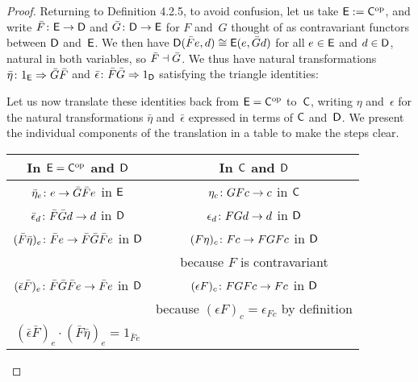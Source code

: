 \documentclass[../../solutions]{subfiles}
\begin{document}
\begin{proof}
  Returning to Definition 4.2.5, to avoid confusion, let us take
  ${\mathsf{E}}:={\mathsf{C}}^{\mathrm{op}}$, and write ${\bar F}\colon{{\mathsf{E}}}\to{{\mathsf{D}}}$ and
  ${\bar G}\colon{{\mathsf{D}}}\to{{\mathsf{E}}}$ for $F$ and~$G$ thought of as
  contravariant functors between ${\mathsf{D}}$ and~${\mathsf{E}}$.  We then have
  ${\mathsf{D}}(\bar Fe,d)\cong {\mathsf{E}}(e,\bar Gd)$ for all $e\in{\mathsf{E}}$ and
  $d\in{\mathsf{D}}$, natural in both variables, so $\bar F\dashv \bar G$.  We
  thus have natural transformations
  ${\bar\eta}\colon{1_{\mathsf{E}}}\Rightarrow{\bar G \bar F}$ and
  ${\bar\epsilon}\colon{\bar F \bar G}\Rightarrow{1_{\mathsf{D}}}$ satisfying the triangle
  identities:
  \begin{center}
  \end{center}
  Let us now translate these identities back from ${\mathsf{E}}={\mathsf{C}}^{\mathrm{op}}$
  to~${\mathsf{C}}$, writing $\eta$ and~$\epsilon$ for the natural
  transformations $\bar\eta$ and~$\bar\epsilon$ expressed in terms of
  ${\mathsf{C}}$ and~${\mathsf{D}}$.  We present the individual components of the
  translation in a table to make the steps clear.
  \begin{center}
    \renewcommand{\arraystretch}{1.4}
    \begin{tabular}{c|c}
      In ${\mathsf{E}}={\mathsf{C}}^{\mathrm{op}}$ and ${\mathsf{D}}$
          & In ${\mathsf{C}}$ and ${\mathsf{D}}$ \\ \hline
      ${\bar\eta_e}\colon{e}\to{\bar G\bar F e}$ in ${\mathsf{E}}$
          & ${\eta_c}\colon{GFc}\to{c}$ in ${\mathsf{C}}$ \\
      ${\bar\epsilon_d}\colon{\bar F\bar G d}\to{d}$ in ${\mathsf{D}}$
          & ${\epsilon_d}\colon{FGd}\to{d}$ in ${\mathsf{D}}$ \\
      ${(\bar F\bar\eta)_e}\colon{\bar F e}\to{\bar F \bar G \bar F e}$ in
      ${\mathsf{D}}$
          & ${(F\eta)_c}\colon{Fc}\to{FGFc}$ in ${\mathsf{D}}$ \\[-5pt]
          & because $F$ is contravariant \\
      ${(\bar\epsilon\bar F)_e}\colon{\bar F \bar G \bar F e}\to{\bar F
      e}$ in ${\mathsf{D}}$
          & ${(\epsilon F)_c}\colon{FGFc}\to{Fc}$ in ${\mathsf{D}}$ \\[-5pt]
          & because $(\epsilon F)_c=\epsilon_{Fc}$ by definition \\
      $(\bar\epsilon \bar F)_e\cdot (\bar F\bar\eta)_e = 1_{\bar F e}$

\end{tabular}
\end{center}
\end{proof}
\end{document}
